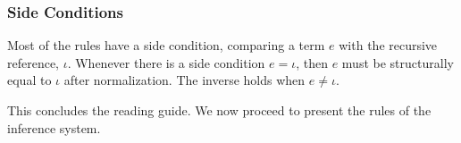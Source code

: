 
\subsubsection{Side Conditions}
Most of the rules have a side condition, comparing a term $e$ with the recursive
reference, $\iota$. Whenever there is a side condition $e = \iota$, then $e$
must be structurally equal to $\iota$ after normalization. The inverse holds when
$e \not = \iota$.

This concludes the reading guide. We now proceed to present the rules of the
inference system.


